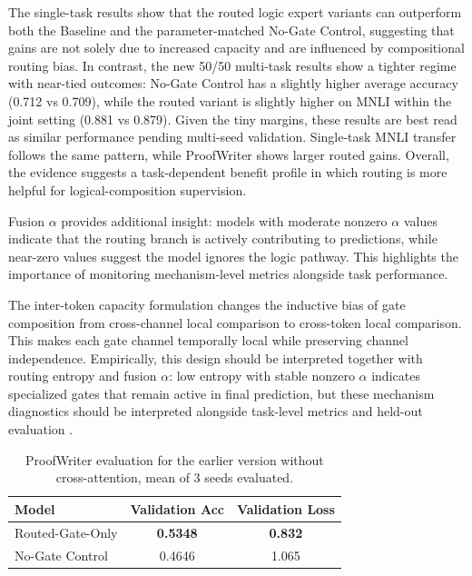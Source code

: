 \documentclass[10pt,twocolumn,letterpaper]{article}
\begin{document}
The single-task results show that the routed logic expert variants can outperform both the
Baseline and the parameter-matched No-Gate Control, suggesting that gains are
not solely due to increased capacity and are influenced by compositional
routing bias. In contrast, the new 50/50 multi-task results show a tighter
regime with near-tied outcomes: No-Gate Control has a slightly higher average
accuracy (0.712 vs 0.709), while the routed variant is slightly higher on MNLI
within the joint setting (0.881 vs 0.879). Given the tiny margins, these
results are best read as similar performance pending multi-seed validation.
Single-task MNLI transfer follows the same pattern, while ProofWriter shows
larger routed gains. Overall, the evidence suggests a task-dependent benefit
profile in which routing is more helpful for logical-composition supervision.

Fusion $\alpha$ provides additional insight: models
with moderate nonzero $\alpha$ values indicate that the routing branch is
actively contributing to predictions, while near-zero values suggest the
model ignores the logic pathway. This highlights the importance of monitoring
mechanism-level metrics alongside task performance.

The inter-token capacity formulation changes the inductive bias of gate
composition from cross-channel local comparison to cross-token local
comparison. This makes each gate channel temporally local while preserving
channel independence. Empirically, this design should be interpreted together
with routing entropy and fusion $\alpha$: low entropy with stable nonzero $\alpha$
indicates specialized gates that remain active in final prediction, but these
mechanism diagnostics should be interpreted alongside task-level metrics and
held-out evaluation \cite{keysers2020measuringcompositionalgeneralizationcomprehensive}.

\begin{table}[t]
\centering
\small
\setlength{\tabcolsep}{4pt}
\begin{tabular}{|l|c|c|}
\hline
Model & Validation Acc & Validation Loss \\
\hline\hline
Routed-Gate-Only & \textbf{0.5348} & \textbf{0.832} \\
No-Gate Control & 0.4646 & 1.065 \\
\hline
\end{tabular}
\caption{ProofWriter evaluation for the earlier version without cross-attention, mean of 3 seeds evaluated.}
\label{tab:routed_gate_only_vs_nogate}
\end{table}
\end{document}
